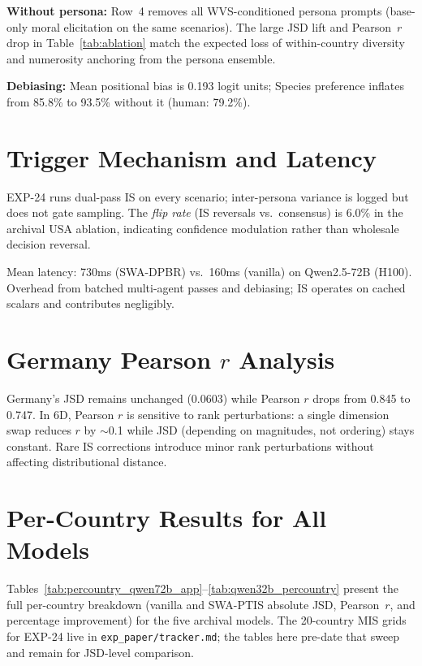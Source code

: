 \documentclass{article}
\begin{document}
\textbf{Without persona:} Row~4 removes all WVS-conditioned persona prompts
(base-only moral elicitation on the same scenarios). The large JSD lift and
Pearson~$r$ drop in Table~\ref{tab:ablation} match the expected loss of
within-country diversity and numerosity anchoring from the persona ensemble.

\textbf{Debiasing:} Mean positional bias is 0.193 logit units; Species preference
inflates from 85.8\% to 93.5\% without it (human: 79.2\%).

\section{Trigger Mechanism and Latency}
\label{app:trigger}

EXP-24 runs dual-pass IS on every scenario; inter-persona variance is logged but
does not gate sampling. The \emph{flip rate} (IS reversals vs.\ consensus) is 6.0\%
in the archival USA ablation, indicating confidence modulation rather than wholesale
decision reversal.

Mean latency: 730ms (SWA-DPBR) vs.\ 160ms (vanilla) on Qwen2.5-72B (H100).
Overhead from batched multi-agent passes and debiasing; IS operates on cached
scalars and contributes negligibly.

\section{Germany Pearson $r$ Analysis}
\label{app:germany}

Germany's JSD remains unchanged (0.0603) while Pearson $r$ drops from 0.845 to 0.747.
In 6D, Pearson $r$ is sensitive to rank perturbations: a single dimension swap reduces
$r$ by $\sim$0.1 while JSD (depending on magnitudes, not ordering) stays constant.
Rare IS corrections introduce minor rank perturbations without affecting
distributional distance.

\section{Per-Country Results for All Models}
\label{app:percountry_all}
\label{app:percountry_qwen72b}
\label{app:percountry_qwen32b}

Tables~\ref{tab:percountry_qwen72b_app}--\ref{tab:qwen32b_percountry} present
the full per-country breakdown (vanilla and SWA-PTIS absolute JSD,
Pearson~$r$, and percentage improvement) for the five archival models. The
20-country MIS grids for EXP-24 live in \texttt{exp\_paper/tracker.md}; the
tables here pre-date that sweep and remain for JSD-level comparison.
\end{document}

